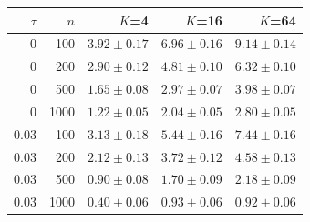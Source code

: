 {\footnotesize\setlength{\tabcolsep}{3.5pt}
\begin{tabular}{rrrrr}
\toprule
$\tau$ & $n$ & $K$=4 & $K$=16 & $K$=64 \\
\midrule
0 & 100 & $3.92 \pm 0.17$ & $6.96 \pm 0.16$ & $9.14 \pm 0.14$ \\
0 & 200 & $2.90 \pm 0.12$ & $4.81 \pm 0.10$ & $6.32 \pm 0.10$ \\
0 & 500 & $1.65 \pm 0.08$ & $2.97 \pm 0.07$ & $3.98 \pm 0.07$ \\
0 & 1000 & $1.22 \pm 0.05$ & $2.04 \pm 0.05$ & $2.80 \pm 0.05$ \\
\midrule
0.03 & 100 & $3.13 \pm 0.18$ & $5.44 \pm 0.16$ & $7.44 \pm 0.16$ \\
0.03 & 200 & $2.12 \pm 0.13$ & $3.72 \pm 0.12$ & $4.58 \pm 0.13$ \\
0.03 & 500 & $0.90 \pm 0.08$ & $1.70 \pm 0.09$ & $2.18 \pm 0.09$ \\
0.03 & 1000 & $0.40 \pm 0.06$ & $0.93 \pm 0.06$ & $0.92 \pm 0.06$ \\
\bottomrule
\end{tabular}}
